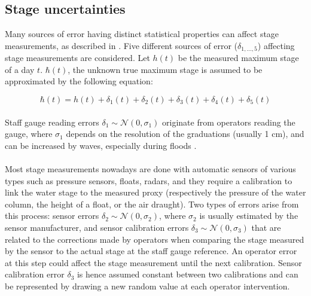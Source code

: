 \documentclass[11pt]{article}
\begin{document}
    \subsection{Stage uncertainties}
    \label{subsec:StageErr}
    
    Many sources of error having distinct statistical properties can affect stage measurements, as described in \citet{horner_impact_2018}. Five different sources of error ($\delta_{1,...,5}$) affecting stage measurements are considered. Let $h(t)$ be the measured maximum stage of a day $t$. $\hbar(t)$, the unknown true maximum stage is assumed to be approximated by the following equation:
    
    \begin{equation}
        \hbar(t) = h(t) + \delta_1(t) + \delta_2(t) + \delta_3(t) + \delta_4(t) + \delta_5(t)
        \label{eq:StageError}
    \end{equation}

    \paragraph{}Staff gauge reading errors $\delta_1 \sim \mathcal{N}(0,\sigma_1)$ originate from operators reading the gauge, where $\sigma_1$ depends on the resolution of the graduations (usually 1 cm), and can be increased by waves, especially during floods \citep{mcmillan_benchmarking_2012}.

    \paragraph{}Most stage measurements nowadays are done with automatic sensors of various types such as pressure sensors, floats, radars, and they require a calibration to link the water stage to the measured proxy (respectively the pressure of the water column, the height of a float, or the air draught). Two types of errors arise from this process: sensor errors $\delta_2 \sim \mathcal{N}(0,\sigma_2)$, where $\sigma_2$ is usually estimated by the sensor manufacturer, and sensor calibration errors $\delta_3 \sim \mathcal{N}(0,\sigma_3)$ that are related to the corrections made by operators when comparing the stage measured by the sensor to the actual stage at the staff gauge reference. An operator error at this step could affect the stage measurement until the next calibration. Sensor calibration error $\delta_3$ is hence assumed constant between two calibrations and can be represented by drawing a new random value at each operator intervention.
    
\end{document}
